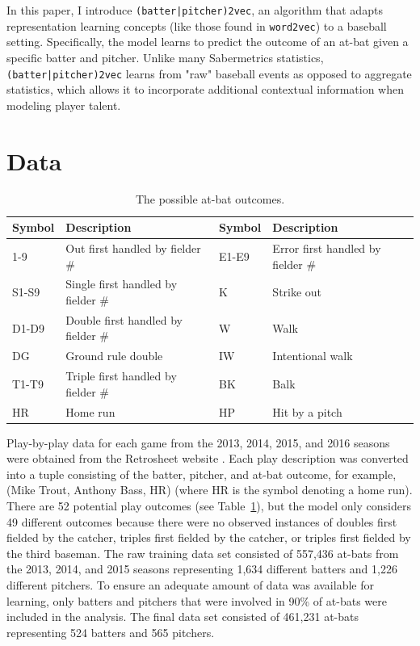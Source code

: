 \documentclass{article}
\begin{document}
In this paper, I introduce \texttt{(batter|pitcher)2vec}, an algorithm that adapts representation learning concepts (like those found in \texttt{word2vec}) to a baseball setting. Specifically, the model learns to predict the outcome of an at-bat given a specific batter and pitcher. Unlike many Sabermetrics statistics, \texttt{(batter|pitcher)2vec} learns from "raw" baseball events as opposed to aggregate statistics, which allows it to incorporate additional contextual information when modeling player talent.

\section{Data}
\label{data}

\begin{table}
\centering
\begin{adjustbox}{max width=\textwidth}
    \begin{tabular}{ | l | l | l | l | }
    \hline
    Symbol & Description & Symbol & Description \\ 
    \hline\hline
    1-9 & Out first handled by fielder \# & E1-E9 & Error first handled by fielder \# \\
    \hline
    S1-S9 & Single first handled by fielder \# & K & Strike out \\
    \hline
    D1-D9 & Double first handled by fielder \# & W & Walk \\
    \hline
    DG & Ground rule double & IW & Intentional walk \\
    \hline
    T1-T9 & Triple first handled by fielder \# & BK & Balk \\
    \hline
    HR & Home run & HP & Hit by a pitch \\
    \hline
    \end{tabular}
\end{adjustbox}
\caption{The possible at-bat outcomes.}
\label{table:at_bats}
\end{table}

Play-by-play data for each game from the 2013, 2014, 2015, and 2016 seasons were obtained from the Retrosheet website \parencite{Retro}. Each play description was converted into a tuple consisting of the batter, pitcher, and at-bat outcome, for example, (Mike Trout, Anthony Bass, HR) (where HR is the symbol denoting a home run). There are 52 potential play outcomes (see Table~\ref{table:at_bats}), but the model only considers 49 different outcomes because there were no observed instances of doubles first fielded by the catcher, triples first fielded by the catcher, or triples first fielded by the third baseman. The raw training data set consisted of 557,436 at-bats from the 2013, 2014, and 2015 seasons representing 1,634 different batters and 1,226 different pitchers. To ensure an adequate amount of data was available for learning, only batters and pitchers that were involved in 90\% of at-bats were included in the analysis. The final data set consisted of 461,231 at-bats representing 524 batters and 565 pitchers.
\end{document}
